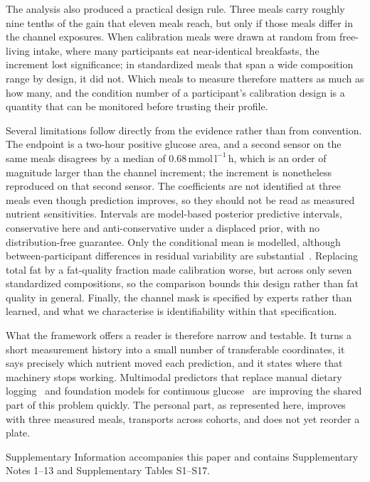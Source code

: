 \documentclass[pdflatex,sn-nature]{sn-jnl}
\newcommand{\aucunit}{\mathrm{mmol\,l^{-1}\,h}}
\theoremstyle{thmstyleone}
\theoremstyle{thmstyletwo}
\theoremstyle{thmstylethree}
\begin{document}
The analysis also produced a practical design rule. Three meals carry roughly nine tenths of the gain that eleven meals reach, but only if those meals differ in the channel exposures. When calibration meals were drawn at random from free-living intake, where many participants eat near-identical breakfasts, the increment lost significance; in standardized meals that span a wide composition range by design, it did not. Which meals to measure therefore matters as much as how many, and the condition number of a participant's calibration design is a quantity that can be monitored before trusting their profile.

Several limitations follow directly from the evidence rather than from convention. The endpoint is a two-hour positive glucose area, and a second sensor on the same meals disagrees by a median of 0.68\,$\aucunit$, which is an order of magnitude larger than the channel increment; the increment is nonetheless reproduced on that second sensor. The coefficients are not identified at three meals even though prediction improves, so they should not be read as measured nutrient sensitivities. Intervals are model-based posterior predictive intervals, conservative here and anti-conservative under a displaced prior, with no distribution-free guarantee. Only the conditional mean is modelled, although between-participant differences in residual variability are substantial~\cite{aegis2026}. Replacing total fat by a fat-quality fraction made calibration worse, but across only seven standardized compositions, so the comparison bounds this design rather than fat quality in general. Finally, the channel mask is specified by experts rather than learned, and what we characterise is identifiability within that specification.

What the framework offers a reader is therefore narrow and testable. It turns a short measurement history into a small number of transferable coordinates, it says precisely which nutrient moved each prediction, and it states where that machinery stops working. Multimodal predictors that replace manual dietary logging~\cite{ppgrimage2026} and foundation models for continuous glucose~\cite{gluformer2026} are improving the shared part of this problem quickly. The personal part, as represented here, improves with three measured meals, transports across cohorts, and does not yet reorder a plate.

\backmatter


Supplementary Information accompanies this paper and contains Supplementary Notes 1--13 and Supplementary Tables S1--S17.
\end{document}
